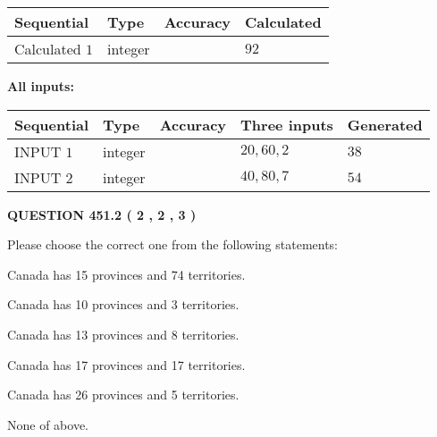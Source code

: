 \documentclass[12pt]{article}
\begin{document}
   
   
   
\noindent{}
   
   
  
  
\noindent\begin{tabular}{|l|l|l|l|}
\hline
 Sequential & Type & Accuracy & Calculated \\ 
\hline
 
 
  Calculated $  1 $ & integer &  & 
  $ 92 $ 
 \\  \hline  
 \end{tabular}
   
   
   
   
\noindent\vspace{0.1in}\hspace{-0.08in} {\textbf{\Large{All inputs: }}}
   
   
  
  
\noindent\begin{tabular}{|l|l|l|l|l|}
\hline
 Sequential & Type & Accuracy & Three inputs & Generated \\ 
\hline
 
 
  INPUT $  1 $ & integer &  & $
 20
 , 
 60
 , 
 2
 $ & $ 38 $ 
 \\  \hline  
 
 
  INPUT $  2 $ & integer &  & $
 40
 , 
 80
 , 
 7
 $ & $ 54 $ 
 \\  \hline  
 \end{tabular}
   
   
  
\vspace{0.2in}
  
{\textbf{\Large{QUESTION
451.2 
 ( 2 , 2 , 3 )
}}}
  
  
Please choose the correct one from the following statements:
 
 
Canada has  15 provinces and  74 territories.
 
 
Canada has 10  provinces and 3 territories.
 
 
Canada has  13 provinces and  8 territories.
 
 
Canada has  17 provinces and  17 territories.
 
 
Canada has  26 provinces and  5 territories.
 
 
 None of above.
 
\end{document}
